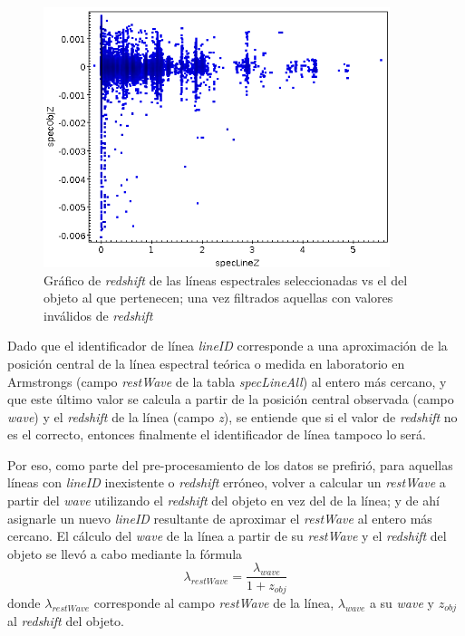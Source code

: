 \begin{figure}[h!]
\begin{center}
\includegraphics[width=0.9\textwidth]{imagenes/specobjz_vs_speclinez.png}
\end{center}
\vspace*{-5mm}
\caption{Gráfico de \textit{redshift} de las líneas espectrales seleccionadas vs el del objeto al que pertenecen; una vez filtrados aquellas con valores inválidos de \textit{redshift}}
\label{fig:specobjz_vs_speclinez}
\end{figure}

Dado que el identificador de línea \textit{lineID} corresponde a una aproximación de la posición central de la línea espectral teórica o medida en laboratorio en Armstrongs (campo \textit{restWave} de la tabla \textit{specLineAll}) al entero más cercano, y que este último valor se calcula a partir de la posición central observada (campo \textit{wave}) y el \textit{redshift} de la línea (campo \textit{z}), se entiende que si el valor de \textit{redshift} no es el correcto, entonces finalmente el identificador de línea tampoco lo será.

Por eso, como parte del pre-procesamiento de los datos se prefirió, para aquellas líneas con \textit{lineID} inexistente o \textit{redshift} erróneo, volver a calcular un \textit{restWave} a partir del \textit{wave} utilizando el \textit{redshift} del objeto en vez del de la línea; y de ahí asignarle un nuevo \textit{lineID} resultante de aproximar el \textit{restWave} al entero más cercano. El cálculo del \textit{wave} de la línea a partir de su \textit{restWave} y el \textit{redshift} del objeto se llevó a cabo mediante la fórmula $$\lambda_{restWave} = \frac{\lambda_{wave}}{1 + z_{obj}}$$ donde $\lambda_{restWave}$ corresponde al campo \textit{restWave} de la línea, $\lambda_{wave}$ a su \textit{wave} y $z_{obj}$ al \textit{redshift} del objeto.

